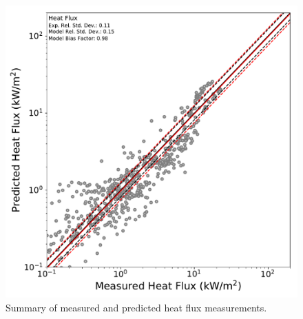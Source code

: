 \begin{figure}[!h]
	\centering
	\includegraphics[width=\columnwidth]{Figures/Plots/Validation/Heat_Flux/loglog_HFs}
	\caption{Summary of measured and predicted heat flux measurements.}
	\label{fig:loglog_HFs}
\end{figure}

\clearpage
